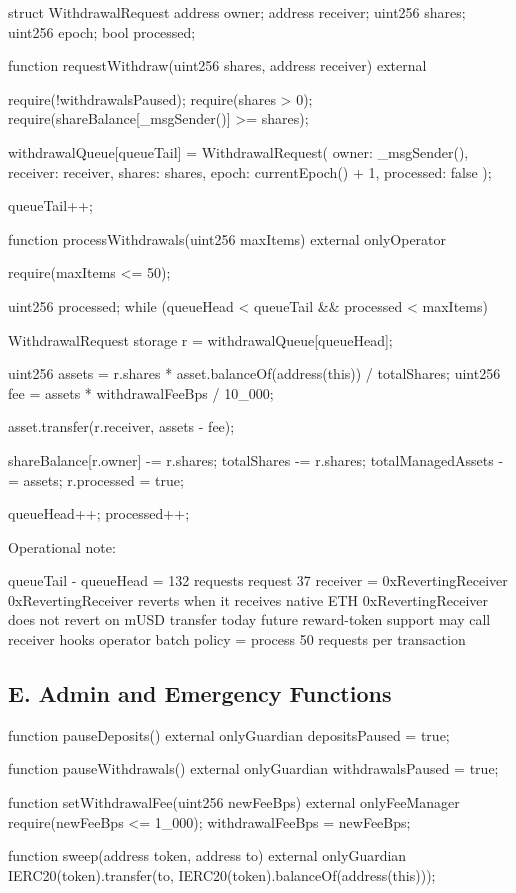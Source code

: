 \begin{codeblock}
struct WithdrawalRequest {
    address owner;
    address receiver;
    uint256 shares;
    uint256 epoch;
    bool processed;
}

function requestWithdraw(uint256 shares, address receiver) external {
    require(!withdrawalsPaused);
    require(shares > 0);
    require(shareBalance[_msgSender()] >= shares);

    withdrawalQueue[queueTail] = WithdrawalRequest({
        owner: _msgSender(),
        receiver: receiver,
        shares: shares,
        epoch: currentEpoch() + 1,
        processed: false
    });

    queueTail++;
}

function processWithdrawals(uint256 maxItems) external onlyOperator {
    require(maxItems <= 50);

    uint256 processed;
    while (queueHead < queueTail && processed < maxItems) {
        WithdrawalRequest storage r = withdrawalQueue[queueHead];

        uint256 assets = r.shares * asset.balanceOf(address(this)) / totalShares;
        uint256 fee = assets * withdrawalFeeBps / 10_000;

        asset.transfer(r.receiver, assets - fee);

        shareBalance[r.owner] -= r.shares;
        totalShares -= r.shares;
        totalManagedAssets -= assets;
        r.processed = true;

        queueHead++;
        processed++;
    }
}
\end{codeblock}

Operational note:

\begin{codeblock}
queueTail - queueHead = 132 requests
request 37 receiver = 0xRevertingReceiver
0xRevertingReceiver reverts when it receives native ETH
0xRevertingReceiver does not revert on mUSD transfer today
future reward-token support may call receiver hooks
operator batch policy = process 50 requests per transaction
\end{codeblock}

\subsection*{E. Admin and Emergency Functions}

\begin{codeblock}
function pauseDeposits() external onlyGuardian {
    depositsPaused = true;
}

function pauseWithdrawals() external onlyGuardian {
    withdrawalsPaused = true;
}

function setWithdrawalFee(uint256 newFeeBps) external onlyFeeManager {
    require(newFeeBps <= 1_000);
    withdrawalFeeBps = newFeeBps;
}

function sweep(address token, address to) external onlyGuardian {
    IERC20(token).transfer(to, IERC20(token).balanceOf(address(this)));
}
\end{codeblock}

